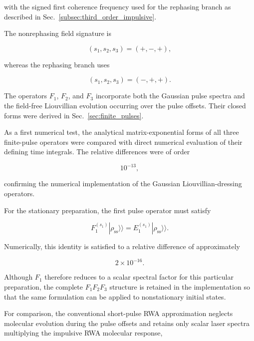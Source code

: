 \documentclass[11pt]{article}
\begin{document}
with the signed first coherence frequency used for the rephasing
branch as described in Sec.~\ref{subsec:third_order_impulsive}.

The nonrephasing field signature is

\begin{equation}
(s_1,s_2,s_3)
=
(+,-,+),
\end{equation}

whereas the rephasing branch uses

\begin{equation}
(s_1,s_2,s_3)
=
(-,+,+).
\end{equation}

The operators $F_1$, $F_2$, and $F_3$ incorporate both the Gaussian
pulse spectra and the field-free Liouvillian evolution occurring over
the pulse offsets.  Their closed forms were derived in
Sec.~\ref{sec:finite_pulses}.

As a first numerical test, the analytical matrix-exponential forms of
all three finite-pulse operators were compared with direct numerical
evaluation of their defining time integrals.  The relative differences
were of order

\begin{equation}
10^{-13},
\end{equation}

confirming the numerical implementation of the Gaussian
Liouvillian-dressing operators.

For the stationary preparation, the first pulse operator must satisfy

\begin{equation}
F_1^{(s_1)}
|\rho_{\mathrm{ss}}\rangle\rangle
=
E_1^{(s_1)}
|\rho_{\mathrm{ss}}\rangle\rangle .
\label{eq:third_order_stationary_F1_identity}
\end{equation}

Numerically, this identity is satisfied to a relative difference of
approximately

\begin{equation}
2\times10^{-16}.
\end{equation}

Although $F_1$ therefore reduces to a scalar spectral factor for this
particular preparation, the complete $F_1F_2F_3$ structure is retained
in the implementation so that the same formulation can be applied to
nonstationary initial states.

For comparison, the conventional short-pulse RWA approximation
neglects molecular evolution during the pulse offsets and retains only
scalar laser spectra multiplying the impulsive RWA molecular response,
\end{document}
